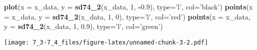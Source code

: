 \documentclass[]{article}
\newenvironment{Shaded}{\begin{snugshade}}{\end{snugshade}}
\newcommand{\KeywordTok}[1]{\textcolor[rgb]{0.13,0.29,0.53}{\textbf{#1}}}
\newcommand{\DataTypeTok}[1]{\textcolor[rgb]{0.13,0.29,0.53}{#1}}
\newcommand{\DecValTok}[1]{\textcolor[rgb]{0.00,0.00,0.81}{#1}}
\newcommand{\FloatTok}[1]{\textcolor[rgb]{0.00,0.00,0.81}{#1}}
\newcommand{\StringTok}[1]{\textcolor[rgb]{0.31,0.60,0.02}{#1}}
\newcommand{\OperatorTok}[1]{\textcolor[rgb]{0.81,0.36,0.00}{\textbf{#1}}}
\newcommand{\NormalTok}[1]{#1}
\begin{document}
\begin{Shaded}
\begin{Highlighting}[]
\KeywordTok{plot}\NormalTok{(}\DataTypeTok{x =}\NormalTok{ x_data, }\DataTypeTok{y =} \KeywordTok{sd74_2}\NormalTok{(x_data, }\DecValTok{1}\NormalTok{, }\OperatorTok{-}\FloatTok{0.9}\NormalTok{), }\DataTypeTok{type=}\StringTok{'l'}\NormalTok{, }\DataTypeTok{col=}\StringTok{'black'}\NormalTok{)}
\KeywordTok{points}\NormalTok{(}\DataTypeTok{x =}\NormalTok{ x_data, }\DataTypeTok{y =} \KeywordTok{sd74_2}\NormalTok{(x_data, }\DecValTok{1}\NormalTok{, }\DecValTok{0}\NormalTok{), }\DataTypeTok{type=}\StringTok{'l'}\NormalTok{, }\DataTypeTok{col=}\StringTok{'red'}\NormalTok{)}
\KeywordTok{points}\NormalTok{(}\DataTypeTok{x =}\NormalTok{ x_data, }\DataTypeTok{y =} \KeywordTok{sd74_2}\NormalTok{(x_data, }\DecValTok{1}\NormalTok{, }\FloatTok{0.9}\NormalTok{), }\DataTypeTok{type=}\StringTok{'l'}\NormalTok{, }\DataTypeTok{col=}\StringTok{'green'}\NormalTok{)}
\end{Highlighting}
\end{Shaded}

\texttt{[image: 7\_3-7\_4\_files/figure-latex/unnamed-chunk-3-2.pdf]}
\end{document}
